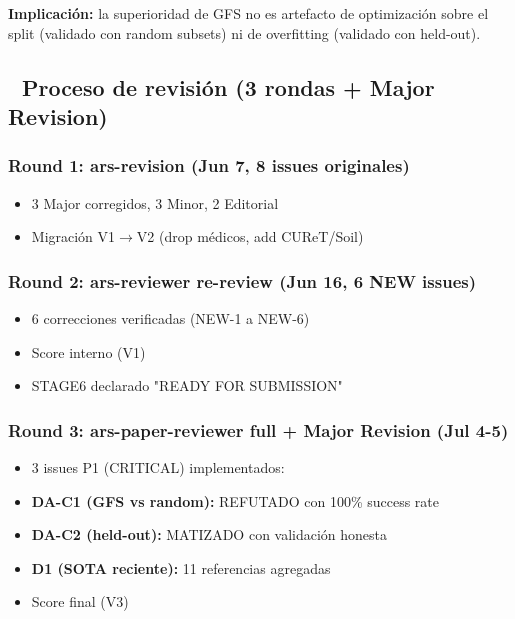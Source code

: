 \textbf{Implicación:} la superioridad de GFS no es artefacto de optimización sobre el split (validado con random subsets) ni de overfitting (validado con held-out).

\hrulefill

\subsection{🔄 Proceso de revisión (3 rondas + Major Revision)}

\subsubsection{Round 1: ars-revision (Jun 7, 8 issues originales)}
\begin{itemize}
  \item 3 Major corregidos, 3 Minor, 2 Editorial
  \item Migración V1$\rightarrow$V2 (drop médicos, add CUReT/Soil)
\end{itemize}

\subsubsection{Round 2: ars-reviewer re-review (Jun 16, 6 NEW issues)}
\begin{itemize}
  \item 6 correcciones verificadas (NEW-1 a NEW-6)
  \item Score interno (V1)
  \item STAGE6 declarado "READY FOR SUBMISSION"
\end{itemize}

\subsubsection{Round 3: ars-paper-reviewer full + Major Revision (Jul 4-5)}
\begin{itemize}
  \item 3 issues P1 (CRITICAL) implementados:
  \item \textbf{DA-C1 (GFS vs random):} REFUTADO con 100\% success rate
  \item \textbf{DA-C2 (held-out):} MATIZADO con validación honesta
  \item \textbf{D1 (SOTA reciente):} 11 referencias agregadas
  \item Score final (V3)
\end{itemize}

\hrulefill


